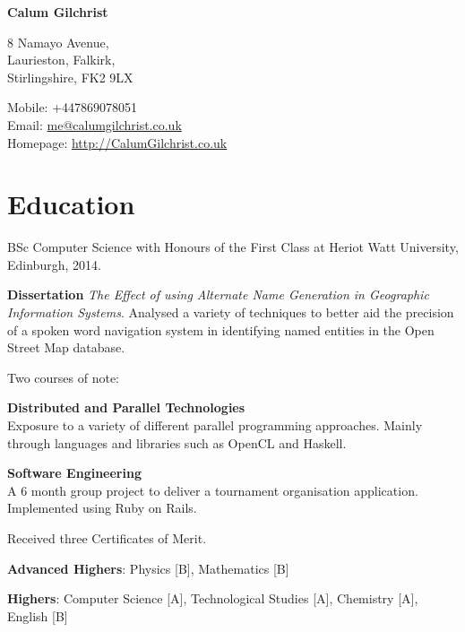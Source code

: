 \documentclass[11pt,a4paper]{article}
\def\name{Calum Gilchrist}
\renewenvironment{itemize}{
  \begin{list}{}{
    \setlength{\leftmargin}{1em}
    \setlength{\itemsep}{0.25em}
    \setlength{\parskip}{0pt}
    \setlength{\parsep}{0.25em}
    \renewcommand{\labelitemi}{$\bullet$}
  }
}{
  \end{list}
}
\begin{document}
%

\setlength{\parskip}{0em}


\centerline{\huge \bf \name}

\bigskip

\begin{minipage}[t]{0.495\textwidth}
  8 Namayo Avenue, \\
  Laurieston, Falkirk, \\
  Stirlingshire, FK2 9LX
\end{minipage}
\begin{minipage}[t]{0.495\textwidth}
  Mobile: +447869078051 \\
  Email: \href{mailto:me@calumgilchrist.co.uk}{me@calumgilchrist.co.uk} \\
  Homepage: \href{http://calumgilchrist.co.uk/}{http://CalumGilchrist.co.uk}
\end{minipage}

\section*{Education}

\begin{itemize}
    \item BSc Computer Science with Honours of the First Class at Heriot Watt University, Edinburgh, 2014.

    \begin{itemize}
        \item \textbf{Dissertation} \emph{The Effect of using Alternate Name Generation in Geographic Information Systems}. Analysed a variety of techniques to better aid the precision of a spoken word navigation system in identifying named entities in the Open Street Map database.
        \item Two courses of note:
            \begin{itemize}
                \item \textbf{Distributed and Parallel Technologies} \\
                    Exposure to a variety of different parallel programming approaches. Mainly through languages and libraries such as OpenCL and Haskell.
                \item \textbf{Software Engineering} \\
                    A 6 month group project to deliver a tournament organisation application. Implemented using Ruby on Rails.
            \end{itemize}
        \item Received three Certificates of Merit. 
    \end{itemize}

    \item \textbf{Advanced Highers}: Physics [B], Mathematics [B]
    \item \textbf{Highers}: Computer Science [A], Technological Studies [A], Chemistry [A], English [B]
\end{itemize}
\end{document}
